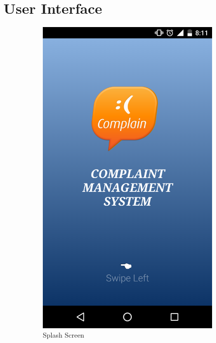 \documentclass{article}
\begin{document}
	\section{User Interface}
	
	    \begin{figure}[H]
      \centering
      \begin{subfigure}{.4\textwidth}
          \centering
          \includegraphics[width=0.9\linewidth]{splash.png}
          \caption{Splash Screen}
          \label{fig:sub1}
      \end{subfigure}%
      \begin{subfigure}{.4\textwidth}
          \centering

\end{subfigure}
\end{figure}
\end{document}
